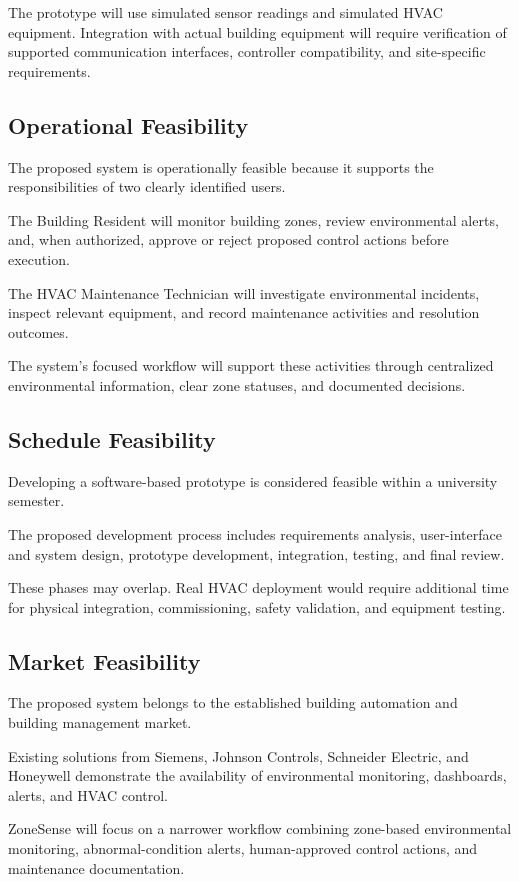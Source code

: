 \documentclass[11pt,a4paper]{article}
\begin{document}
The prototype will use simulated sensor readings and simulated HVAC equipment. Integration with actual building equipment will require verification of supported communication interfaces, controller compatibility, and site-specific requirements.

\subsection{Operational Feasibility}
The proposed system is operationally feasible because it supports the responsibilities of two clearly identified users.

The Building Resident will monitor building zones, review environmental alerts, and, when authorized, approve or reject proposed control actions before execution.

The HVAC Maintenance Technician will investigate environmental incidents, inspect relevant equipment, and record maintenance activities and resolution outcomes.

The system's focused workflow will support these activities through centralized environmental information, clear zone statuses, and documented decisions.

\subsection{Schedule Feasibility}
Developing a software-based prototype is considered feasible within a university semester.

The proposed development process includes requirements analysis, user-interface and system design, prototype development, integration, testing, and final review.

These phases may overlap. Real HVAC deployment would require additional time for physical integration, commissioning, safety validation, and equipment testing.

\subsection{Market Feasibility}
The proposed system belongs to the established building automation and building management market.

Existing solutions from Siemens, Johnson Controls, Schneider Electric, and Honeywell demonstrate the availability of environmental monitoring, dashboards, alerts, and HVAC control.

ZoneSense will focus on a narrower workflow combining zone-based environmental monitoring, abnormal-condition alerts, human-approved control actions, and maintenance documentation.
\end{document}
